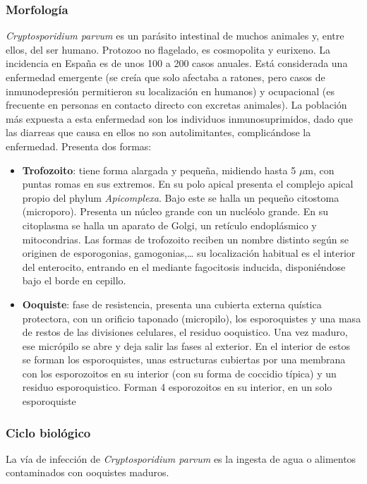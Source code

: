 \subsubsection{Morfología}
\textit{Cryptosporidium parvum} es un parásito intestinal de muchos animales y, entre ellos, del ser humano. Protozoo no flagelado, es cosmopolita y eurixeno. La incidencia en España es de unos 100 a 200 casos anuales. Está considerada una enfermedad emergente (se creía que solo afectaba a ratones, pero casos de inmunodepresión permitieron su localización en humanos) y ocupacional (es frecuente en personas en contacto directo con excretas animales). La población más expuesta a esta enfermedad son los individuos inmunosuprimidos, dado que las diarreas que causa en ellos no son autolimitantes, complicándose la enfermedad. Presenta dos formas:
\begin{itemize}[itemsep=0pt,parsep=0pt,topsep=0pt,partopsep=0pt]
	\item \textbf{Trofozoito}: tiene forma alargada y pequeña, midiendo hasta 5 $\mu$m, con puntas romas en sus extremos. En su polo apical presenta el complejo apical propio del phylum \textit{Apicomplexa}. Bajo este se halla un pequeño citostoma (microporo). Presenta un núcleo grande con un nucléolo grande. En su citoplasma se halla un aparato de Golgi, un retículo endoplásmico y mitocondrias. Las formas de trofozoito reciben un nombre distinto según se originen de esporogonias, gamogonias,… su localización habitual es el interior del enterocito, entrando en el mediante fagocitosis inducida, disponiéndose bajo el borde en cepillo.
	\item \textbf{Ooquiste}: fase de resistencia, presenta una cubierta externa quística protectora, con un orificio taponado (micropilo), los esporoquistes y una masa de restos de las divisiones celulares, el residuo ooquistico. Una vez maduro, ese micrópilo se abre y deja salir las fases al exterior. En el interior de estos se forman los esporoquistes, unas estructuras cubiertas por una membrana con los esporozoitos en su interior (con su forma de coccidio típica) y un residuo esporoquistico. Forman 4 esporozoitos en su interior, en un solo esporoquiste
\end{itemize}
\subsubsection{Ciclo biológico}
La vía de infección de \textit{Cryptosporidium parvum} es la ingesta de agua o alimentos contaminados con ooquistes maduros. 

